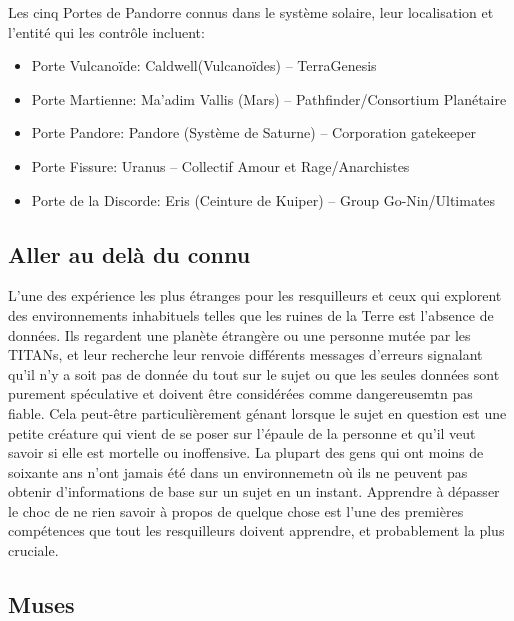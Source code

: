 Les cinq Portes de Pandorre connus dans le système solaire, leur localisation et l'entité qui les contrôle incluent: 

\begin{itemize} \item Porte Vulcanoïde: Caldwell(Vulcanoïdes) -- TerraGenesis \item Porte Martienne: Ma'adim Vallis (Mars) -- Pathfinder/Consortium Planétaire \item Porte Pandore: Pandore (Système de Saturne) -- Corporation gatekeeper \item Porte Fissure: Uranus -- Collectif Amour et Rage/Anarchistes \item Porte de la Discorde: Eris (Ceinture de Kuiper) -- Group Go-Nin/Ultimates \end{itemize} 

\subsection{Aller au delà du connu} \label{sec:going-beyond-known} 

L'une des expérience les plus étranges pour les resquilleurs et ceux qui explorent des environnements inhabituels telles que les ruines de la Terre est l'absence de données. Ils regardent une planète étrangère ou une personne mutée par les TITANs, et leur recherche leur renvoie différents messages d'erreurs signalant qu'il n'y a soit pas de donnée du tout sur le sujet ou que les seules données sont purement spéculative et doivent être considérées comme dangereusemtn pas fiable. Cela peut-être particulièrement génant lorsque le sujet en question est une petite créature qui vient de se poser sur l'épaule de la personne et qu'il veut savoir si elle est mortelle ou inoffensive. La plupart des gens qui ont moins de soixante ans n'ont jamais été dans un environnemetn où ils ne peuvent pas obtenir d'informations de base sur un sujet en un instant. Apprendre à dépasser le choc de ne rien savoir à propos de quelque chose est l'une des premières compétences que tout les resquilleurs doivent apprendre, et probablement la plus cruciale. 

\subsection{Muses} \label{sec:muses} 

